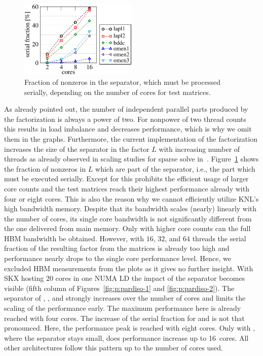\begin{figure}[t]%
  \centering%
  \includegraphics[width=0.5\textwidth,clip=true]{images/matrices-serial-fraction}%
  \caption{Fraction of nonzeros in the separator, which must be processed
   serially, depending on the number of cores for test matrices.  }%
  \label{fig:p:serial-fraciton}%
\end{figure}

As already pointed out, the number of independent parallel parts produced by the
factorization is always a power of two.
For nonpower of two thread counts this results in load imbalance and decreases
performance, which is why we omit them in the graphs.
%
Furthermore, the current implementation of the factorization increases the size
of the separator in the factor $L$ with increasing number of threads as already
observed in scaling studies for sparse solve in~\cite{klawonn-2015}.
%
Figure~\ref{fig:p:serial-fraciton} shows the fraction of nonzeros in $L$ which are
part of the separator, i.e., the part which must be executed serially.
Except for  this prohibits the efficient usage of larger core
counts and the test matrices reach their highest performance already with four
or eight cores.
%
This is also the reason why we cannot efficiently utilize KNL's high bandwidth
memory.
Despite that its bandwidth scales (nearly) linearly with the number of cores, its
single core bandwidth is not significantly different from the one delivered from
main memory.
Only with higher core counts can the full HBM bandwidth be obtained.
However, with $16$, $32$, and $64$ threads the serial fraction of the resulting
factor from the matrices is already too high and performance nearly drops to
the single core performance level.
Hence, we excluded HBM measurements from the plots as it gives no further
insight.
%
With SKX hosting $20$ cores in one NUMA LD the impact of the separator becomes
visible (fifth column of Figures~\ref{fig:p:pardiso-1} and \ref{fig:p:pardiso-2}).
The separator of , , and \/ strongly increases 
over the number of cores and limits the scaling of the performance early.
The maximum performance here is already reached with four cores.
The increase of the serial fraction for  and  is not
that pronounced.
Here, the performance peak is reached with eight cores.
Only with , where the separator stays small, does performance increase
up to 16~cores.
All other architectures follow this pattern up to the number of cores used.

